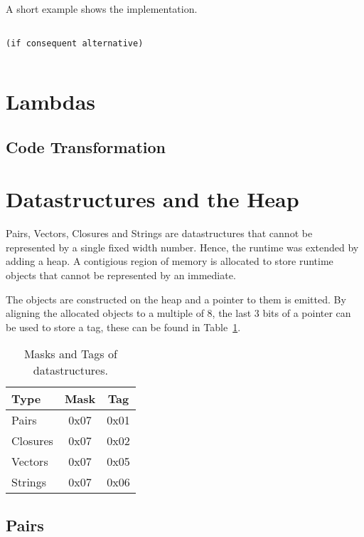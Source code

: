 \documentclass{article}
\begin{document}
A short example shows the implementation.

\begin{verbatim}

(if consequent alternative)

\end{verbatim}

\begin{verbatim}

\end{verbatim}

\section{Lambdas}

\subsection{Code Transformation}

\section{Datastructures and the Heap}

Pairs, Vectors, Closures and Strings are datastructures that cannot be represented by a single fixed width number. Hence, the runtime was extended by adding a heap. A contigious region of memory is allocated to store runtime objects that cannot be represented by an immediate.

The objects are constructed on the heap and a pointer to them is emitted. By aligning the allocated objects to a multiple of 8, the last 3 bits of a pointer can be used to store a tag, these can be found in Table~\ref{tab:datastructures}.

\begin{table}[ht]
  \centering
\begin{tabular}{ l c c }
  \toprule
  Type & Mask & Tag  \\ \hline
  \midrule
  Pairs  & 0x07 & 0x01 \\
  Closures & 0x07 & 0x02 \\
  Vectors & 0x07 & 0x05 \\
  Strings & 0x07 & 0x06 \\
  \bottomrule
\end{tabular}
\caption{Masks and Tags of datastructures.} \label{tab:datastructures}
\end{table}

\subsection{Pairs}
\end{document}
